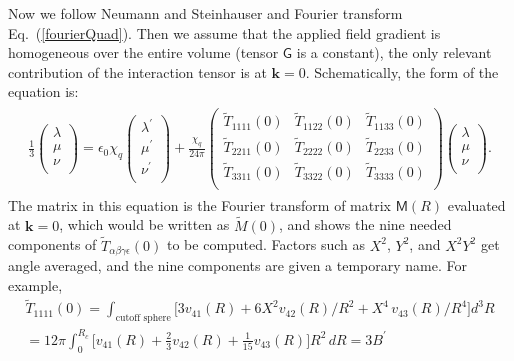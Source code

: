 Now we follow Neumann and Steinhauser and Fourier transform Eq.~(\ref{fourierQuad}).  Then we assume that 
the applied field gradient is homogeneous over the entire volume (tensor $\mathsf{G}$ is a constant), the only relevant contribution of the interaction tensor is at $\mathbf{k}=0$.  Schematically, the form of the equation is:
\begin{gather}
\begin{aligned}
\frac{1}{3}
\begin{pmatrix}
\lambda\\
\mu\\
\nu\\
\end{pmatrix}
= \epsilon_0 \chi_q
\begin{pmatrix}
\lambda^\prime\\
\mu^\prime\\
\nu^\prime\\
\end{pmatrix}
+\frac{\chi_q}{24\pi}
\begin{pmatrix}
\tilde{T}_{1111}(0) & \tilde{T}_{1122}(0) & \tilde{T}_{1133}(0)\\
\tilde{T}_{2211}(0) & \tilde{T}_{2222}(0) & \tilde{T}_{2233}(0)\\
\tilde{T}_{3311}(0) & \tilde{T}_{3322}(0) & \tilde{T}_{3333}(0)\\
\end{pmatrix}
\begin{pmatrix}
\lambda\\
\mu\\
\nu\\
\end{pmatrix} .
\end{aligned}
\label{eq:schematic}
\end{gather}
The matrix in this equation is the Fourier transform of matrix $\mathsf{M}(R)$ evaluated at
$\mathbf{k}=0$, which would be written as $\tilde{M}(0)$, and shows the 
nine needed components of $\tilde{T}_{\alpha \beta \gamma \epsilon}(0)$ to be computed.
Factors such as  $X^2$, $Y^2$, and $X^2 Y^2$ get angle averaged, and the nine components
are given a temporary name.  For example,
\begin{gather*}
\tilde{T}_{1111}(0)=
\int_{\textrm{cutoff sphere}} 
\big [ 3v_{41}(R)+6X^2v_{42}(R)/R^2 + X^4\,v_{43}(R)/R^4 \big] d^3R \\ 
=12\pi \int_0^{R_c}
\big [ v_{41}(R)+\frac{2}{3} v_{42}(R) + \frac{1}{15}v_{43}(R) \big] R^2\,dR =
3B^\prime
\end{gather*}
